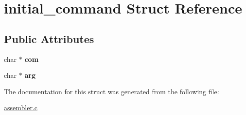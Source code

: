 \hypertarget{structinitial__command}{}\section{initial\+\_\+command Struct Reference}
\label{structinitial__command}
\subsection*{Public Attributes}
\begin{DoxyCompactItemize}
\item 
\mbox{\label{structinitial__command_a599dc65777d539ecc292dd029d1d807f}} 
char $\ast$ {\bfseries com}
\item 
\mbox{\label{structinitial__command_acc03927b571904e3b6b390dbafdb6924}} 
char $\ast$ {\bfseries arg}
\end{DoxyCompactItemize}


The documentation for this struct was generated from the following file\+:\begin{DoxyCompactItemize}
\item 
\mbox{\hyperlink{assembler_8c}{assembler.\+c}}\end{DoxyCompactItemize}
